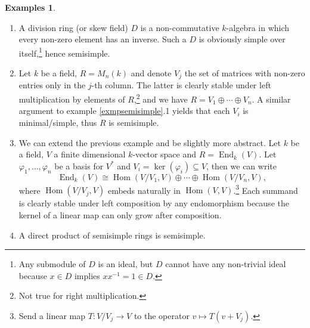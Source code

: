 \documentclass{tufte-handout} %
\theoremstyle{definition}
\newtheorem{exmps}[thm]{Examples}
\theoremstyle{remark}
\DeclareMathOperator{\End}{End}
\DeclareMathOperator{\Hom}{Hom}
\begin{document}
\begin{exmps}
	\begin{enumerate}
		\item A division ring (or skew field) $D$ is a non-commutative $k$-algebra in which every non-zero element has an inverse. Such a $D$ is obviously simple over itself,\footnote{Any submodule of $D$ is an ideal, but $D$ cannot have any non-trivial ideal because $x \in D$ implies $xx^{-1} = 1 \in D$.} hence semisimple.
		\item Let $k$ be a field, $R = M_n(k)$ and denote $V_j$ the set of matrices with non-zero entries only in the $j$-th column. The latter is clearly stable under left multiplication by elements of $R$,\footnote{Not true for right multiplication.} and we have $R = V_1 \oplus \cdots \oplus V_n$. A similar argument to example \ref{exmpsemisimple}.1 yields that each $V_i$ is minimal/simple, thus $R$ is semisimple.
		\item We can extend the previous example and be slightly more abstract. Let $k$ be a field, $V$ a finite dimensional $k$-vector space and $R = \End_k(V)$. Let $\varphi_1, \dots, \varphi_n$ be a basis for $V^*$ and $V_i = \ker(\varphi_i) \subseteq V$, then we can write \[\End_k(V) \cong \Hom(V/V_1, V) \oplus \cdots \oplus \Hom(V/V_n,V),\]
		where $\Hom(V/V_j,V)$ embeds naturally in $\Hom(V,V)$.\footnote{Send a linear map $T: V/V_j \rightarrow V$ to the operator $v \mapsto T(v+V_j)$.} Each summand is clearly stable under left composition by any endomorphism because the kernel of a linear map can only grow after composition.
		
		\item A direct product of semisimple rings is semisimple. 
	\end{enumerate}
\end{exmps}
\end{document}
